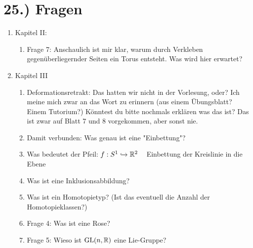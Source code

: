 \documentclass[a5paper,oneside]{scrbook}
\begin{document}
\section*{25.) Fragen}
\begin{enumerate}
  \item Kapitel II:
  \begin{enumerate}
    \item Frage 7: Anschaulich ist mir klar, warum durch Verkleben gegenüberliegernder Seiten ein Torus entsteht. Was wird hier erwartet?
  \end{enumerate}
  \item Kapitel III
  \begin{enumerate}
    \item Deformationsretrakt: Das hatten wir nicht in der Vorlesung, oder? Ich meine mich zwar an das Wort zu erinnern (aus einem Übungsblatt? Einem Tutorium?) Könntest du bitte nochmals erklären was das ist?
Das ist zwar auf Blatt 7 und 8 vorgekommen, aber sonst nie.
    \item Damit verbunden: Was genau ist eine "Einbettung"?
    \item Was bedeutet der Pfeil: $f:S^1 \hookrightarrow \mathbb{R}^2\;\;\;$ Einbettung der Kreislinie in die Ebene
    \item Was ist eine Inklusionsabbildung?
    \item Was ist ein Homotopietyp? (Ist das eventuell die Anzahl der Homotopieklassen?)
    \item Frage 4: Was ist eine Rose?
    \item Frage 5: Wieso ist $\mathrm{GL}(n, \mathbb{R})$ eine Lie-Gruppe?
  \end{enumerate}
\end{enumerate}
\end{document}
